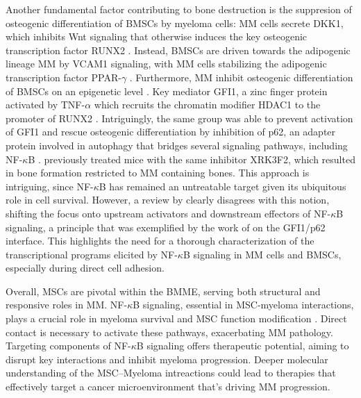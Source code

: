 Another fundamental factor contributing to bone destruction is the suppresion of
osteogenic differentiation of \acp{BMSC} by myeloma cells: \ac{MM} cells secrete
DKK1, which inhibits Wnt signaling that otherwise induces the key osteogenic
transcription factor RUNX2  \cite{gaurCanonicalWNTSignaling2005,
    qiangDkk1inducedInhibitionWnt2008, zhouDickkopf1KeyRegulator2013}. Instead,
\acp{BMSC} are driven towards the adipogenic lineage \ac{MM} by VCAM1 signaling,
with MM cells stabilizing the adipogenic transcription factor PPAR-$\gamma$
\cite{dotterweichContactMyelomaCells2016, liuMyelomaCellsShift2020}.
Furthermore, \ac{MM} inhibit osteogenic differentiation of \acp{BMSC} on an
epigenetic level \cite{allegraEpigeneticCrosstalkMalignant2022}. Key mediator
GFI1, a zinc finger protein activated by TNF-$\alpha$ which recruits the
chromatin modifier HDAC1 to the promoter of RUNX2
\cite{dsouzaGfi1ExpressedBone2011, adamikEZH2HDAC1Inhibition2017}. Intriguingly,
the same group was able to prevent activation of GFI1 and rescue osteogenic
differentiation by inhibition of p62, an adapter protein involved in autophagy
that bridges several signaling pathways, including NF-$\kappa$B
\cite{adamikXRK3F2InhibitionP62ZZ2018}. \citet{teramachiBlockingZZDomain2016}
previously treated mice with the same inhibitor XRK3F2, which resulted in bone
formation restricted to MM containing bones. This approach is intriguing, since
NF-$\kappa$B has remained an untreatable target given its ubiquitous role in
cell survival. However, a review by \citet{verzellaNFkBPharmacopeiaNovel2022}
clearly disagrees with this notion,
shifting the focus onto upstream activators and downstream effectors of
NF-$\kappa$B signaling, a principle that was exemplified by the work of
\citet{adamikXRK3F2InhibitionP62ZZ2018} on the GFI1/p62 interface. This
highlights the need for a thorough characterization of the transcriptional
programs elicited by NF-$\kappa$B signaling in \ac{MM} cells and \acp{BMSC},
especially during direct cell adhesion.


Overall, \acp{MSC} are pivotal within the \ac{BMME}, serving both structural and
responsive roles in \ac{MM}. NF-$\kappa$B signaling, essential in MSC-myeloma
interactions, plays a crucial role in myeloma survival and MSC function
modification \cite{cippitelliRoleNFkBSignaling2023,
    royNFkBActivatingPathways2018}. Direct contact is necessary to activate these
pathways, exacerbating \ac{MM} pathology. Targeting components of NF-$\kappa$B
signaling offers therapeutic potential, aiming to disrupt key interactions and
inhibit myeloma progression. Deeper molecular understanding of the MSC--Myeloma
intreactions could lead to therapies that effectively target a cancer
microenvironment that's driving \ac{MM} progression.








